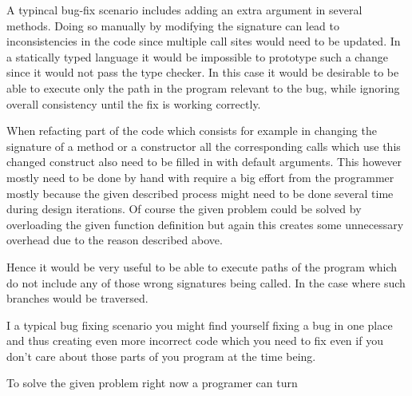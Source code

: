   A typincal bug-fix scenario includes adding an extra argument in several methods. Doing so manually by modifying the signature can lead to inconsistencies in the code since multiple call sites would need to be updated. In a statically typed language it would be impossible to prototype such a change since it would not pass the type checker. In this case it would be desirable to be able to execute only the path in the program relevant to the bug, while ignoring overall consistency until the fix is working correctly.
  

  When refacting part of the code which consists for example in changing the signature of a method or a constructor all the corresponding calls which use this changed construct also need to be filled in with default arguments. This however mostly need to be done by hand with require a big effort from the programmer mostly because the given described process might need to be done several time during design iterations. Of course the given problem could be solved by overloading the given function definition but again this creates some unnecessary overhead due to the reason described above.

  Hence it would be very useful to be able to execute paths of the program which do not include any of those wrong signatures being called. In the case where such branches would be traversed.

  I a typical bug fixing scenario you might find yourself fixing a bug in one place and thus creating even more incorrect code which you need to fix even if you don't care about those parts of you program at the time being.

  To solve the given problem right now a programer can turn

